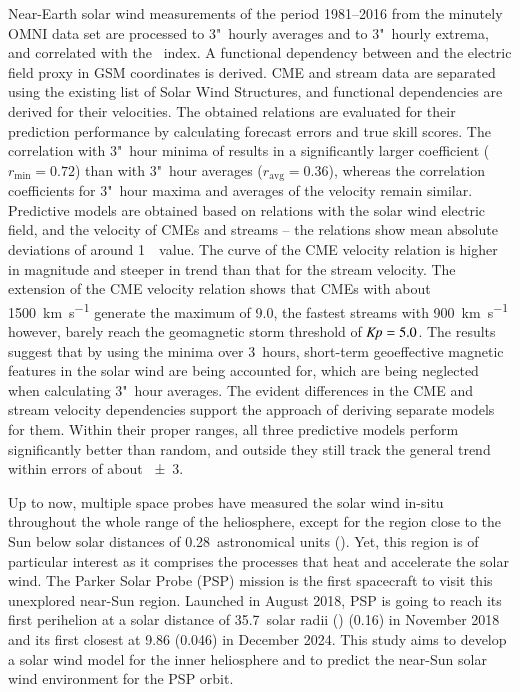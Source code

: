 Near-Earth solar wind measurements of the period 1981--2016 from the minutely OMNI data set are processed to 3"~hourly averages and to 3"~hourly extrema, and correlated with the \Kp~index. A functional dependency between \Kp{} and the electric field proxy \vBz{} in GSM coordinates is derived. CME and stream data are separated using the existing list of Solar Wind Structures, and functional \Kp{} dependencies are derived for their velocities. The obtained relations are evaluated for their prediction performance by calculating forecast errors and true skill scores.
The \Kp{} correlation with 3"~hour minima of \vBz{} results in a significantly larger coefficient ($r_\text{min} = 0.72$) than with 3"~hour averages ($r_\text{avg} = 0.36$), whereas the correlation coefficients for 3"~hour maxima and averages of the velocity remain similar. Predictive \Kp{} models are obtained based on relations with the solar wind electric field, and the velocity of CMEs and streams -- the relations show mean absolute deviations of around 1~\Kp~value. The curve of the CME velocity relation is higher in magnitude and steeper in trend than that for the stream velocity. The extension of the CME velocity relation shows that CMEs with about \SI{1500}{\km\per\s} generate the maximum \Kp{} of \num{9.0}, the fastest streams with \SI{900}{\km\per\s} however, barely reach the geomagnetic storm threshold of $\text{\textit{Kp}} = 5.0$.
The results suggest that by using the \vBz{} minima over 3~hours, short-term geoeffective magnetic features in the solar wind are being accounted for, which are being neglected when calculating 3"~hour averages. The evident differences in the CME and stream velocity dependencies support the approach of deriving separate \Kp{} models for them. Within their proper \Kp{} ranges, all three predictive models perform significantly better than random, and outside they still track the general trend within \Kp{} errors of about \num{+-3}.

\medskip

Up to now, multiple space probes have measured the solar wind in-situ throughout the whole range of the heliosphere, except for the region close to the Sun below solar distances of \num{0.28}~astronomical units (\si{\au}). Yet, this region is of particular interest as it comprises the processes that heat and accelerate the solar wind. The Parker Solar Probe (PSP) mission is the first spacecraft to visit this unexplored near-Sun region. Launched in August 2018, PSP is going to reach its first perihelion at a solar distance of \num{35.7}~solar radii (\si{\Rs}) (\SI{0.16}{\au}) in November 2018 and its first closest at \SI{9.86}{\Rs} (\SI{0.046}{\au}) in December 2024.
This study aims to develop a solar wind model for the inner heliosphere and to predict the near-Sun solar wind environment for the PSP orbit.

